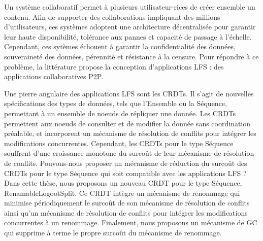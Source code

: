 \begin{ThesisAbstract}
    \vspace{-3cm}
    \begin{FrenchAbstract}
        Un système collaboratif permet à plusieurs utilisateur-rices de créer ensemble un contenu.
        Afin de supporter des collaborations impliquant des millions d'utilisateurs, ces systèmes adoptent une architecture décentralisée pour garantir leur haute disponibilité, tolérance aux pannes et capacité de passage à l'échelle.
        Cependant, ces sytèmes échouent à garantir la confidentialité des données, souveraineté des données, pérennité et résistance à la censure.
        Pour répondre à ce problème, la littérature propose la conception d'applications \acf{LFS} : des applications collaboratives \acf{P2P}.

        Une pierre angulaire des applications \ac{LFS} sont les \acfp{CRDT}.
        Il s'agit de nouvelles spécifications des types de données, tels que l'Ensemble ou la Séquence, permettant à un ensemble de noeuds de répliquer une donnée.
        Les \acp{CRDT} permettent aux noeuds de consulter et de modifier la donnée sans coordination préalable, et incorporent un mécanisme de résolution de conflits pour intégrer les modifications concurrentes.
        Cependant, les \acp{CRDT} pour le type Séquence souffrent d'une croissance monotone du surcoût de leur mécanisme de résolution de conflits.
        Pouvons-nous proposer un mécanisme de réduction du surcoût des \acp{CRDT} pour le type Séquence qui soit compatible avec les applications \ac{LFS} ?
        Dans cette thèse, nous proposons un nouveau \ac{CRDT} pour le type Séquence, RenamableLogootSplit.
        Ce \ac{CRDT} intègre un mécanisme de renommage qui minimise périodiquement le surcoût de son mécanisme de résolution de conflits ainsi qu'un mécanisme de résolution de conflits pour intégrer les modifications concurrentes à un renommage.
        Finalement, nous proposons un mécanisme de \acf{GC} qui supprime à terme le propre surcoût du mécanisme de renommage.


\end{FrenchAbstract}
\end{ThesisAbstract}
